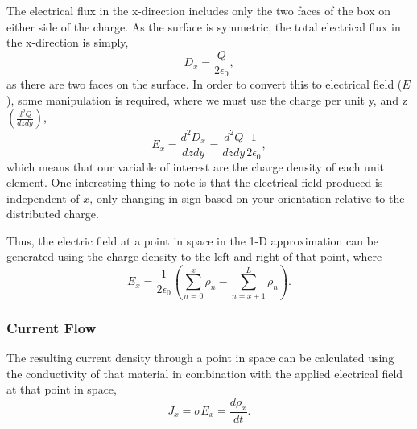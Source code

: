 \documentclass[conference]{IEEEtran}
\begin{document}
	The electrical flux in the x-direction includes only the two faces of the box on either side of the charge. As the surface is symmetric, the total electrical flux in the x-direction is simply,
	\begin{equation}
	D_x = \frac{Q}{2\epsilon_0},
	\end{equation}
	as there are two faces on the surface. In order to convert this to electrical field ($E$), some manipulation is required, where we must use the charge per unit y, and z $\left(\frac{d^2Q}{dzdy}\right)$,
	\begin{equation}
	E_x = \frac{d^2D_x}{dzdy} = \frac{d^2Q}{dzdy}\frac{1}{2\epsilon_0},
	\end{equation}
	which means that our variable of interest are the charge density of each unit element. One interesting thing to note is that the electrical field produced is independent of $x$, only changing in sign based on your orientation relative to the distributed charge.
	
	Thus, the electric field at a point in space in the 1-D approximation can be generated using the charge density to the left and right of that point, where
	\begin{equation}
	E_x = \frac{1}{2\epsilon_0}\left(\sum_{n=0}^{x}\rho_n - \sum_{n=x+1}^{L}\rho_n \right).
	\end{equation}
	
	\subsubsection{Current Flow}
	The resulting current density through a point in space can be calculated using the conductivity of that material in combination with the applied electrical field at that point in space,
	\begin{equation}
	J_x = \sigma E_x = \frac{d\rho_x}{dt}.
	\end{equation}
	
	
\end{document}
